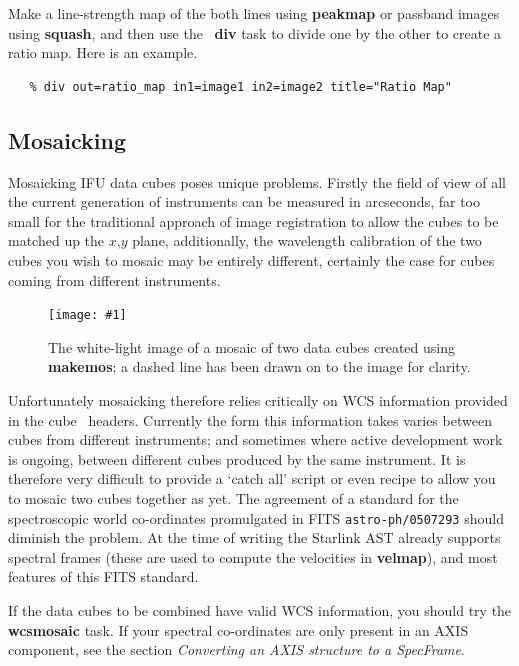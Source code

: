 \documentclass[twoside,11pt]{article}
\newcommand{\htmladdimg}[1]{}
\newcommand{\xref}[3]{#1}
\newcommand{\xlabel}[1]{}
\newcommand{\myfig} [5] {
  \begin{figure}[thb]
    \centering\texttt{[image: \#1]}
    \typeout{#1 inserted on page \arabic{page}}
    \caption{\label{#4}#5}
  \end{figure}
  }
\newcommand{\myfig}[5]{
    \label{#4} \htmladdimg{#3}\\
    Figure: #5\\
    }
\begin{document}
{Make a line-strength map of the both lines using \xref{{\bf
peakmap}}{sun237}{peakmap} or passband images using \xref{{\bf
squash}}{sun237}{squash}, and then use the \KAPPA\ 
\xref{{\bf div}}{sun95}{DIV} task to divide one by the other to create a
ratio map.  Here is an example.

\small\begin{verbatim}
   % div out=ratio_map in1=image1 in2=image2 title="Ratio Map"
\end{verbatim}\normalsize

\subsection{\xlabel{sc16_mos}Mosaicking\label{sc16_mos}}

Mosaicking IFU data cubes poses unique problems.  Firstly the
field of view of all the current generation of instruments can be
measured in arcseconds, far too small for the traditional approach of
image registration to allow the cubes to be matched up the $x$,$y$
plane, additionally, the wavelength calibration of the two cubes you
wish to mosaic may be entirely different, certainly the case for cubes
coming from different instruments.

\myfig{sc16_mosaic.eps}{height=0.5\textheight}{sc16_mosaic.gif}{sc16_mosaic_fig}{The
white-light image of a mosaic of two data cubes created using {\bf makemos};
a dashed line has been drawn on to the image for clarity.}

Unfortunately mosaicking therefore relies critically on WCS
information provided in the cube \FITSref\ headers.  Currently the form
this information takes varies between cubes from different
instruments; and sometimes where active development work is ongoing,
between different cubes produced by the same instrument.  It is
therefore very difficult to provide a `catch all' script or even
recipe to allow you to mosaic two cubes together as yet.  The
agreement of a standard for the spectroscopic world co-ordinates
promulgated in FITS {\tt astro-ph/0507293} should diminish the problem.
At the time of writing the Starlink \xref{AST}{sun210}{} already
supports spectral frames (these are used to compute the velocities in
{\bf velmap}), and most features of this FITS standard.

If the data cubes to be combined have valid WCS information,
you should try the \xref{{\bf wcsmosaic}}{sun95}{WCSMOSAIC} task.
If your spectral co-ordinates are only present in an AXIS component,
see the section \xref{{\em Converting an AXIS structure to a
SpecFrame}}{sun95}{se_wcsuse}{}.

}
\end{document}
